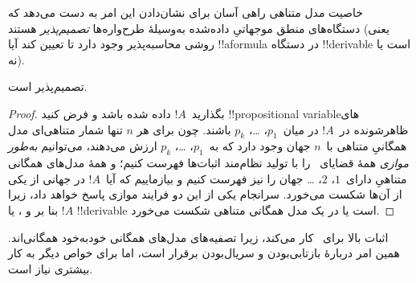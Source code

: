 \documentclass[../../../include/open-logic-section]{subfiles}
\begin{document}

خاصیت مدل متناهی راهی آسان برای نشان‌دادن این امر به دست می‌دهد که
دستگاه‌های منطق موجهاتیِ داده‌شده به‌وسیلهٔ طرح‌واره‌ها \emph{تصمیم‌پذیر}
هستند (یعنی روشی محاسبه‌پذیر وجود دارد تا تعیین کند آیا !!a{formula}
در دستگاه !!{derivable} است یا نه).

\begin{thm}
   تصمیم‌پذیر است.
\end{thm}

\begin{proof}
  بگذارید~$!A$ داده شده باشد و فرض کنید !!{propositional variable}های
  ظاهرشونده در~$!A$ در میان~$p_1$، \dots، $p_k$ باشند. چون برای هر
  $n$ تنها شمار متناهی‌ای مدل همگانیِ متناهی با~$n$ جهان وجود دارد که
  به~$p_1$، \dots، $p_k$ ارزش می‌دهند، می‌توانیم \emph{به‌طور موازی}
  همهٔ قضایای~ را با تولید نظام‌مند اثبات‌ها فهرست کنیم؛ و
  همهٔ مدل‌های همگانی متناهیِ دارای~$1$، $2$، \dots{} جهان را نیز
  فهرست کنیم و بیازماییم که آیا~$!A$ در جهانی از یکی از آن‌ها شکست
  می‌خورد. سرانجام یکی از این دو فرایند موازی پاسخ خواهد داد، زیرا بنا
  بر  و ، یا
  $!A$ !!{derivable} است یا در یک مدل همگانی متناهی شکست می‌خورد.
\end{proof}

اثبات بالا برای~ کار می‌کند، زیرا تصفیه‌های مدل‌های همگانی
خودبه‌خود همگانی‌اند. همین امر دربارهٔ بازتابی‌بودن و سریال‌بودن برقرار
است، اما برای خواص دیگر به کار بیشتری نیاز است.
\end{document}
